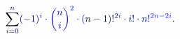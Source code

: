 \documentclass[12pt]{article}
\begin{document}
\makeatletter
\renewcommand*{\@textcolor}[3]{%
  \protect\leavevmode
  \begingroup
    \color#1{#2}#3%
  \endgroup
}
\makeatother
\begin{displaymath}
\mathcolor[RGB]{0,0,15}{\sum} _ { \mathcolor[RGB]{0,0,30}{i} \mathcolor[RGB]{0,0,45}{=} \mathcolor[RGB]{0,0,60}{0} } ^ { \mathcolor[RGB]{0,0,75}{n} } \mathcolor[RGB]{0,0,90}{(} \mathcolor[RGB]{0,0,105}{-} \mathcolor[RGB]{0,0,120}{1} \mathcolor[RGB]{0,0,135}{)} ^ { \mathcolor[RGB]{0,0,150}{i} } \mathcolor[RGB]{0,0,165}{\cdot} \mathcolor[RGB]{0,0,180}{\binom { \mathcolor[RGB]{0,0,195}{n} } { \mathcolor[RGB]{0,0,210}{i} } } ^ { \mathcolor[RGB]{0,0,225}{2} } \mathcolor[RGB]{0,0,240}{\cdot} \mathcolor[RGB]{0,0,255}{(} \mathcolor[RGB]{0,15,0}{n} \mathcolor[RGB]{0,15,15}{-} \mathcolor[RGB]{0,15,30}{1} \mathcolor[RGB]{0,15,45}{)} \mathcolor[RGB]{0,15,60}{!} ^ { \mathcolor[RGB]{0,15,75}{2} \mathcolor[RGB]{0,15,90}{i} } \mathcolor[RGB]{0,15,105}{\cdot} \mathcolor[RGB]{0,15,120}{i} \mathcolor[RGB]{0,15,135}{!} \mathcolor[RGB]{0,15,150}{\cdot} \mathcolor[RGB]{0,15,165}{n} \mathcolor[RGB]{0,15,180}{!} ^ { \mathcolor[RGB]{0,15,195}{2} \mathcolor[RGB]{0,15,210}{n} \mathcolor[RGB]{0,15,225}{-} \mathcolor[RGB]{0,15,240}{2} \mathcolor[RGB]{0,15,255}{i} } \mathcolor[RGB]{0,30,0}{.}
\end{displaymath}
\end{document}
